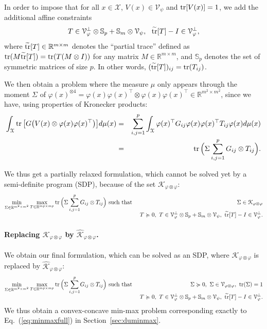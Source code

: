 \documentclass[11pt]{article}
\newcommand{\BEAS}{\begin{eqnarray*}}
\newcommand{\EEAS}{\end{eqnarray*}}
\newcommand{\BEA}{\begin{eqnarray}}
\newcommand{\EEA}{\end{eqnarray}}
\newcommand{\tr}{\mathop{ \rm tr}}
\newcommand{\idm}{I}
\newcommand{\rb}{\mathbb{R}}
\newcommand{\mysec}[1]{Section~\ref{sec:#1}}
\newcommand{\eq}[1]{Eq.~(\ref{eq:#1})}
\def \X{{\mathcal X}}
\def \V{{\mathcal V}}
\begin{document}
 In order to impose that for all $x \in \X$,  $V(x) \in \V_\psi$ and $\tr [ V(x) ] = 1$, we add the additional affine constraints
 \[
  T \in  \V_\varphi^\perp \otimes \mathbb{S}_p + \mathbb{S}_m \otimes \V_\psi ,   \  \  \widetilde{\tr} [T]  - \idm \in \V_\varphi^\perp,
\]
where $\widetilde{\tr} [T] \in \rb^{m \times m} $ denotes the ``partial trace'' defined as $\tr( M \widetilde{\tr} [T]  ) = \tr( T( M \otimes \idm))$ for any matrix $M \in \rb^{ m \times m}$, and $\mathbb{S}_p$ denotes the set of symmetric matrices of size $p$.  In other words, $(\widetilde{\tr} [T]) _{ij} = \tr( T_{ij})$.

  We then obtain a problem where the measure $\mu$ only appears through the moment $\Sigma$ of $\varphi(x)^{\otimes 4} = \varphi(x)\varphi(x)^\top\otimes \varphi(x)\varphi(x)^\top \in \rb^{m^2 \times m^2}$, since we have, using properties of Kronecker products:
    \BEAS
  \int_\X  \tr \big[ G \big( V(x)  \otimes \varphi(x) \varphi(x)^\top \big) \big] d\mu(x)
  & = & \sum_{i,j=1}^p \int_\X \varphi(x)^\top G_{ij} \varphi(x) \varphi(x)^\top T_{ij} \varphi(x) d\mu(x) 
  \\
  & = & \tr \Big( \Sigma \sum_{i,j=1}^p  G_{ij} \otimes T_{ij} \Big).
  \EEAS
     
  
  We thus get a partially relaxed formulation, which cannot be solved yet by a semi-definite program (SDP), because of the set $\mathcal{K}_{\varphi\otimes \varphi}$:
   \BEA
\label{eq:partialSOS}
\min_{\Sigma \in \rb^{m^2 \times m^2}} \max_{T \in \rb^{mp \times mp}}
 \tr \Big( \Sigma \sum_{i,j=1}^p  \! G_{ij} \otimes T_{ij} \Big) &  \mbox{ such that} &  \ \Sigma  \in \mathcal{K}_{\varphi\otimes \varphi}\\[-.2cm]
\notag & &\  T \succcurlyeq 0, \ T \in  \V_\varphi^\perp \otimes \mathbb{S}_p + \mathbb{S}_m\otimes \V_\psi ,  \ \widetilde{\tr} [T] - \idm \in \V_\varphi^\perp.
\EEA
\paragraph{Replacing $ {\mathcal{K}_{\varphi \otimes \varphi} }$ by $\widehat{\mathcal{K}}_{\varphi \otimes \varphi}$.}
We obtain our final formulation, which can be solved as an SDP, where $ \mathcal{K}_{\varphi\otimes \varphi}$
 is replaced by  $\widehat{\mathcal{K}}_{\varphi\otimes \varphi}$:
   \BEA
   \label{eq:fullSOS}
\min_{\Sigma \in \rb^{m^2 \times m^2}} \max_{T \in \rb^{mp \times mp}}
 \tr \Big( \Sigma \sum_{i,j=1}^p  \! G_{ij} \otimes T_{ij} \Big) &  \mbox{ such that} &  \ \Sigma \succcurlyeq 0 , \  \Sigma \in \V_{\varphi \otimes \varphi},  \ \tr(\Sigma) = 1 \\[-.2cm]
\notag & &\  T \succcurlyeq 0, \ T \in  \V_\varphi^\perp \otimes \mathbb{S}_p + \mathbb{S}_m\otimes \V_\psi ,  \ \widetilde{\tr} [T] - \idm \in \V_\varphi^\perp.
\EEA
We thus obtain a convex-concave min-max problem corresponding exactly to \eq{minmaxfull} in \mysec{duminmax}.
\end{document}
